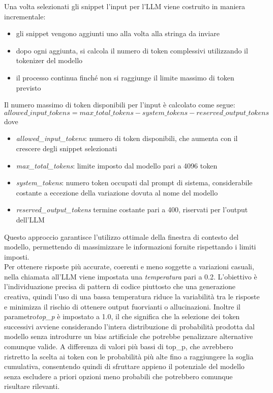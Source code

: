 \documentclass{article}
\begin{document}
Una volta selezionati gli snippet l'input per l'LLM viene costruito in maniera incrementale:
\begin{itemize}
    \item gli snippet vengono aggiunti uno alla volta alla stringa da inviare
    \item dopo ogni aggiunta, si calcola il numero di token complessivi utilizzando il tokenizer del modello
    \item il processo continua finché non si raggiunge il limite massimo di token previsto
\end{itemize}
Il numero massimo di token disponibili per l’input è calcolato come segue:
\begin{equation}
    allowed\_input\_tokens = max\_total\_tokens - system\_tokens - reserved\_output\_tokens
\end{equation}
dove
\begin{itemize}
    \item \textit{allowed\_input\_tokens}: numero di token disponibili, che aumenta con il crescere degli snippet selezionati
    \item \textit{max\_total\_tokens}: limite imposto dal modello pari a 4096 token
    \item \textit{system\_tokens}: numero token occupati dal prompt di sistema, considerabile costante a eccezione della variazione dovuta al nome del modello
    \item \textit{reserved\_output\_tokens} termine costante pari a 400,  riservati per l’output dell’LLM
\end{itemize}
Questo approccio garantisce l'utilizzo ottimale della finestra di contesto del modello, permettendo di massimizzare le informazioni fornite rispettando i limiti imposti.\\
Per ottenere risposte più accurate, coerenti e meno soggette a variazioni casuali, nella chiamata all'LLM viene impostata una \textit{temperatura} pari a 0.2. L'obiettivo è l’individuazione precisa di pattern di codice piuttosto che una generazione creativa, quindi l'uso di una bassa temperatura riduce la variabilità tra le risposte e minimizza il rischio di ottenere output fuorvianti o allucinazioni. Inoltre il parametro\textit{top\_p} è impostato a 1.0, il che significa che la selezione dei token successivi avviene considerando l'intera distribuzione di probabilità prodotta dal modello senza introdurre un bias artificiale che potrebbe penalizzare alternative comunque valide. A differenza di valori più bassi di top\_p, che avrebbero ristretto la scelta ai token con le probabilità più alte fino a raggiungere la soglia cumulativa, consentendo quindi di sfruttare appieno il potenziale del modello senza escludere a priori opzioni meno probabili che potrebbero comunque risultare rilevanti.\\
\end{document}
